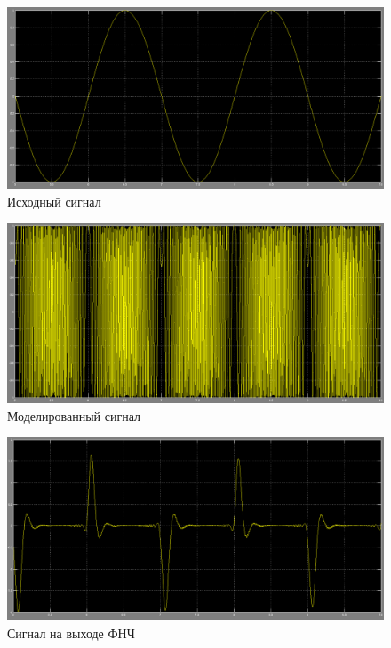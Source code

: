 \begin{figure}[H]

\includegraphics[width=150mm, scale = 0.9]{lab8/8_13}
   \caption{Исходный сигнал}

\end{figure}
\begin{figure}[H]

\includegraphics[width=150mm, scale = 0.9]{lab8/8_14}
   \caption{Моделированный сигнал}

\end{figure}
\begin{figure}[H]

\includegraphics[width=150mm, scale = 0.9]{lab8/8_15}
   \caption{Сигнал на выходе ФНЧ}

\end{figure}
